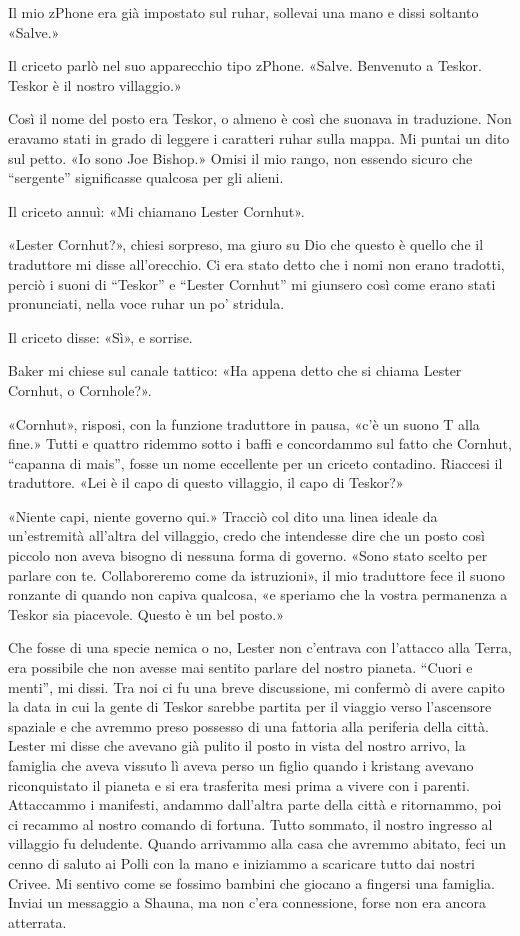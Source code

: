 Il mio zPhone era già impostato sul ruhar, sollevai una mano e dissi
soltanto «Salve.»

Il criceto parlò nel suo apparecchio tipo zPhone. «Salve. Benvenuto a
Teskor. Teskor è il nostro villaggio.»

Così il nome del posto era Teskor, o almeno è così che suonava in
traduzione. Non eravamo stati in grado di leggere i caratteri ruhar
sulla mappa. Mi puntai un dito sul petto. «Io sono Joe Bishop.» Omisi il
mio rango, non essendo sicuro che ``sergente'' significasse qualcosa per
gli alieni.

Il criceto annuì: «Mi chiamano Lester Cornhut».

«Lester Cornhut?», chiesi sorpreso, ma giuro su Dio che questo è quello
che il traduttore mi disse all'orecchio. Ci era stato detto che i nomi
non erano tradotti, perciò i suoni di ``Teskor'' e ``Lester Cornhut'' mi
giunsero così come erano stati pronunciati, nella voce ruhar un po'
stridula.

Il criceto disse: «Sì», e sorrise.

Baker mi chiese sul canale tattico: «Ha appena detto che si chiama
Lester Cornhut, o Cornhole?».

«Cornhut», risposi, con la funzione traduttore in pausa, «c'è un suono T
alla fine.» Tutti e quattro ridemmo sotto i baffi e concordammo sul
fatto che Cornhut, ``capanna di mais'', fosse un nome eccellente per un
criceto contadino. Riaccesi il traduttore. «Lei è il capo di questo
villaggio, il capo di Teskor?»

«Niente capi, niente governo qui.» Tracciò col dito una linea ideale da
un'estremità all'altra del villaggio, credo che intendesse dire che un
posto così piccolo non aveva bisogno di nessuna forma di governo. «Sono
stato scelto per parlare con te. Collaboreremo come da istruzioni», il
mio traduttore fece il suono ronzante di quando non capiva qualcosa, «e
speriamo che la vostra permanenza a Teskor sia piacevole. Questo è un
bel posto.»

Che fosse di una specie nemica o no, Lester non c'entrava con l'attacco
alla Terra, era possibile che non avesse mai sentito parlare del nostro
pianeta. ``Cuori e menti'', mi dissi. Tra noi ci fu una breve
discussione, mi confermò di avere capito la data in cui la gente di
Teskor sarebbe partita per il viaggio verso l'ascensore spaziale e che
avremmo preso possesso di una fattoria alla periferia della città.
Lester mi disse che avevano già pulito il posto in vista del nostro
arrivo, la famiglia che aveva vissuto lì aveva perso un figlio quando i
kristang avevano riconquistato il pianeta e si era trasferita mesi prima
a vivere con i parenti. Attaccammo i manifesti, andammo dall'altra parte
della città e ritornammo, poi ci recammo al nostro comando di fortuna.
Tutto sommato, il nostro ingresso al villaggio fu deludente. Quando
arrivammo alla casa che avremmo abitato, feci un cenno di saluto ai
Polli con la mano e iniziammo a scaricare tutto dai nostri Crivee. Mi
sentivo come se fossimo bambini che giocano a fingersi una famiglia.
Inviai un messaggio a Shauna, ma non c'era connessione, forse non era
ancora atterrata.

